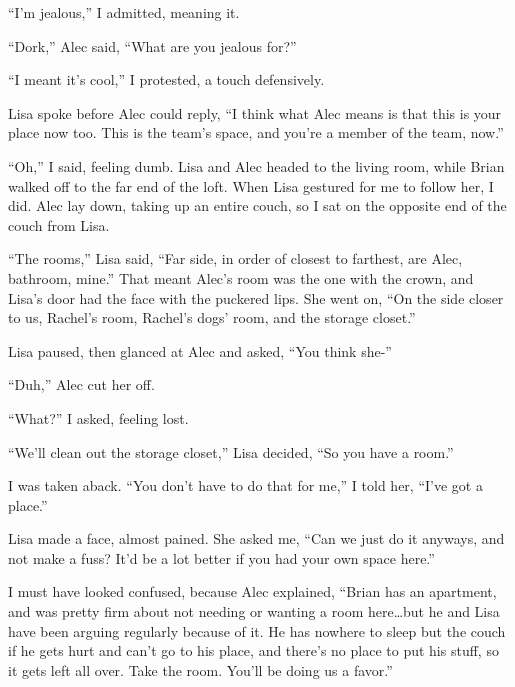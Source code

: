 ``I'm jealous,'' I admitted, meaning it.



``Dork,'' Alec said, ``What are you jealous for?''



``I meant it's cool,'' I protested, a touch defensively.



Lisa spoke before Alec could reply, ``I think what Alec means is that this is your place now too.  This is the team's space, and you're a member of the team, now.''



``Oh,'' I said, feeling dumb.  Lisa and Alec headed to the living room, while Brian walked off to the far end of the loft.  When Lisa gestured for me to follow her, I did.  Alec lay down, taking up an entire couch, so I sat on the opposite end of the couch from Lisa.



``The rooms,'' Lisa said, ``Far side, in order of closest to farthest, are Alec, bathroom, mine.''  That meant Alec's room was the one with the crown, and Lisa's door had the face with the puckered lips.  She went on, ``On the side closer to us, Rachel's room, Rachel's dogs' room, and the storage closet.''



Lisa paused, then glanced at Alec and asked, ``You think she-''



``Duh,'' Alec cut her off.



``What?'' I asked, feeling lost.



``We'll clean out the storage closet,'' Lisa decided, ``So you have a room.''



I was taken aback.  ``You don't have to do that for me,'' I told her, ``I've got a place.''



Lisa made a face, almost pained.  She asked me, ``Can we just do it anyways, and not make a fuss?  It'd be a lot better if you had your own space here.''



I must have looked confused, because Alec explained, ``Brian has an apartment, and was pretty firm about not needing or wanting a room here\ldots but he and Lisa have been arguing regularly because of it.  He has nowhere to sleep but the couch if he gets hurt and can't go to his place, and there's no place to put his stuff, so it gets left all over.  Take the room.  You'll be doing us a favor.''



